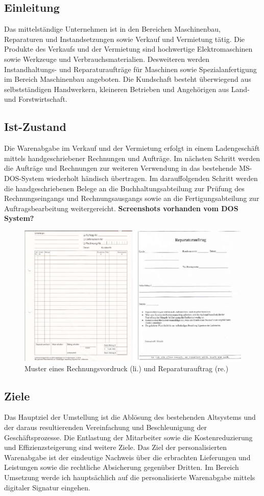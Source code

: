 \subsection{Einleitung}
Das mittelständige Unternehmen ist in den Bereichen Maschinenbau, Reparaturen und Instandsetzungen sowie Verkauf und Vermietung tätig. Die Produkte des Verkaufs und der Vermietung sind hochwertige Elektromaschinen sowie Werkzeuge und Verbrauchsmaterialien. Desweiteren werden Instandhaltungs- und Reparaturaufträge für Maschinen sowie Spezialanfertigung im Bereich Maschinenbau angeboten. Die Kundschaft besteht überwiegend aus selbstständigen Handwerkern, kleineren Betrieben und Angehörigen aus Land- und Forstwirtschaft. \cite{einleitung1}
\subsection{Ist-Zustand}
Die Warenabgabe im Verkauf und der Vermietung erfolgt in einem Ladengeschäft mittels handgeschriebener Rechnungen und Aufträge. Im nächsten Schritt werden die Aufträge und Rechnungen zur weiteren Verwendung in das bestehende MS-DOS-System wiederholt händisch übertragen. Im darauffolgenden Schritt werden die handgeschriebenen Belege an die Buchhaltungsabteilung zur Prüfung des Rechnungseingangs und Rechnungsausgangs sowie an die Fertigungsabteilung zur Auftragsbearbeitung weitergereicht. \textbf{Screenshots vorhanden vom DOS System?} \cite{einleitung1}
\begin{figure}[!ht]
    \centering
    \includegraphics{rechnungReparaturAlt2.png}
    \caption[Muster Rechnungsvordruck und Reparaturauftrag]{Muster eines Rechnungsvordruck (li.) und Reparaturauftrag (re.) \cite{einleitung1}}
    \label{fig:4}
\end{figure}
\subsection{Ziele}
Das Hauptziel der Umstellung ist die Ablösung des bestehenden Altsystems und der daraus resultierenden Vereinfachung und Beschleunigung der Geschäftsprozesse. Die Entlastung der Mitarbeiter sowie die Kostenreduzierung und Effizienzsteigerung sind weitere Ziele. Das Ziel der personalisierten Warenabgabe ist der eindeutige Nachweis über die erbrachten Lieferungen und Leistungen sowie die rechtliche Absicherung gegenüber Dritten. Im Bereich Umsetzung werde ich hauptsächlich auf die personalisierte Warenabgabe mittels digitaler Signatur eingehen. \cite{einleitung1}